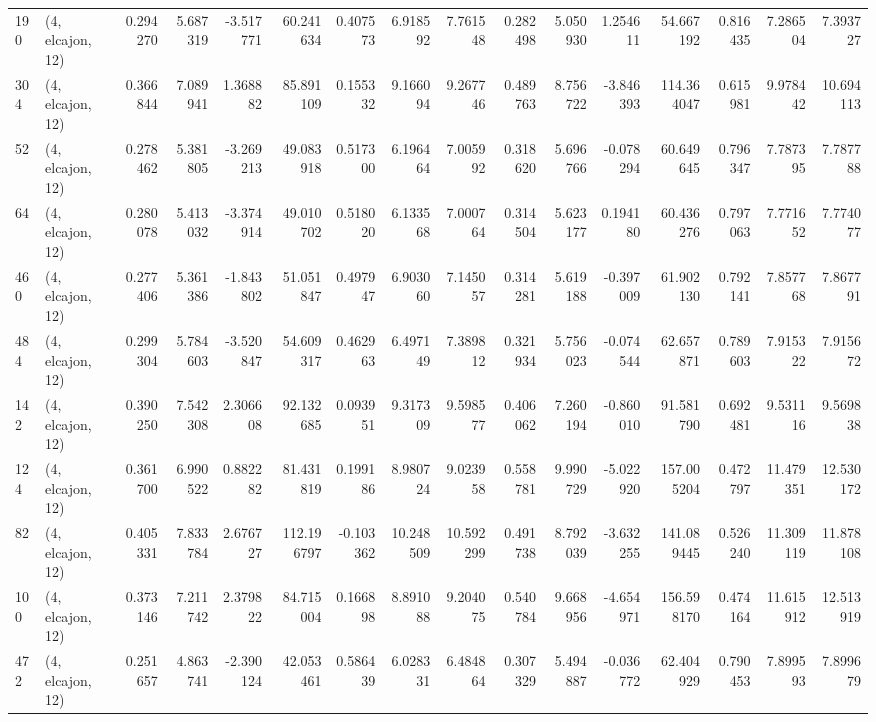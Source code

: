 \begin{tabular}{llrrrrrrrrrrrrrr}
190 &  (4, elcajon, 12) &   0.294270 &   5.687319 &  -3.517771 &    60.241634 &   0.407573 &   6.918592 &   7.761548 &  0.282498 &   5.050930 &   1.254611 &    54.667192 &  0.816435 &   7.286504 &   7.393727 \\
304 &  (4, elcajon, 12) &   0.366844 &   7.089941 &   1.368882 &    85.891109 &   0.155332 &   9.166094 &   9.267746 &  0.489763 &   8.756722 &  -3.846393 &   114.364047 &  0.615981 &   9.978442 &  10.694113 \\
52  &  (4, elcajon, 12) &   0.278462 &   5.381805 &  -3.269213 &    49.083918 &   0.517300 &   6.196464 &   7.005992 &  0.318620 &   5.696766 &  -0.078294 &    60.649645 &  0.796347 &   7.787395 &   7.787788 \\
64  &  (4, elcajon, 12) &   0.280078 &   5.413032 &  -3.374914 &    49.010702 &   0.518020 &   6.133568 &   7.000764 &  0.314504 &   5.623177 &   0.194180 &    60.436276 &  0.797063 &   7.771652 &   7.774077 \\
460 &  (4, elcajon, 12) &   0.277406 &   5.361386 &  -1.843802 &    51.051847 &   0.497947 &   6.903060 &   7.145057 &  0.314281 &   5.619188 &  -0.397009 &    61.902130 &  0.792141 &   7.857768 &   7.867791 \\
484 &  (4, elcajon, 12) &   0.299304 &   5.784603 &  -3.520847 &    54.609317 &   0.462963 &   6.497149 &   7.389812 &  0.321934 &   5.756023 &  -0.074544 &    62.657871 &  0.789603 &   7.915322 &   7.915672 \\
142 &  (4, elcajon, 12) &   0.390250 &   7.542308 &   2.306608 &    92.132685 &   0.093951 &   9.317309 &   9.598577 &  0.406062 &   7.260194 &  -0.860010 &    91.581790 &  0.692481 &   9.531116 &   9.569838 \\
124 &  (4, elcajon, 12) &   0.361700 &   6.990522 &   0.882282 &    81.431819 &   0.199186 &   8.980724 &   9.023958 &  0.558781 &   9.990729 &  -5.022920 &   157.005204 &  0.472797 &  11.479351 &  12.530172 \\
82  &  (4, elcajon, 12) &   0.405331 &   7.833784 &   2.676727 &   112.196797 &  -0.103362 &  10.248509 &  10.592299 &  0.491738 &   8.792039 &  -3.632255 &   141.089445 &  0.526240 &  11.309119 &  11.878108 \\
100 &  (4, elcajon, 12) &   0.373146 &   7.211742 &   2.379822 &    84.715004 &   0.166898 &   8.891088 &   9.204075 &  0.540784 &   9.668956 &  -4.654971 &   156.598170 &  0.474164 &  11.615912 &  12.513919 \\
472 &  (4, elcajon, 12) &   0.251657 &   4.863741 &  -2.390124 &    42.053461 &   0.586439 &   6.028331 &   6.484864 &  0.307329 &   5.494887 &  -0.036772 &    62.404929 &  0.790453 &   7.899593 &   7.899679 \\

\end{tabular}
